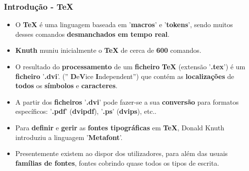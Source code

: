 \documentclass[12pt]{beamer}
\begin{document}
\begin{frame}
\frametitle{{\color{blue}\bf Introdução - \TeX}}
\begin{itemize}
\item<1->O {\color{blue}\bf TeX} é uma linguagem baseada em 
'{\color{DarkGreen}\bf macros}' e '{\color{DarkGreen}\bf tokens}', 
sendo muitos desses comandos {\color{DarkRed}\bf desmanchados em tempo real}.
\item<2->{\color{blue}\bf Knuth} muniu inicialmente o {\color{blue}\bf TeX} 
de cerca de {\color{red}\bf 600} comandos.
\item<3->O resultado do {\color{DarkGreen}\bf processamento} de um 
{\color{DarkRed}\bf ficheiro} {\color{blue}\bf TeX} 
(extensão '{\color{blue}\bf .tex}')
é um {\color{DarkRed}\bf ficheiro} '{\color{blue}\bf .dvi}'.
(''{\color{DarkGreen} {\bf D}e{\bf V}ice {\bf I}ndependent}'') 
que contém as {\color{DarkRed}\bf localizações} de
{\color{red}\bf todos} os {\color{DarkGreen}\bf símbolos} e 
{\color{DarkGreen}\bf caracteres}. 
\item<5->A partir dos {\color{DarkRed}\bf ficheiros} '{\color{blue}\bf .dvi}' 
pode fazer-se a sua {\color{red}\bf conversão} 
para formatos específicos: '{\color{red}\bf .pdf}' ({\color{blue}\bf dvipdf}), 
'{\color{red}\bf .ps}' ({\color{blue}\bf dvips}), etc..
\item<6->Para {\color{DarkGreen}\bf definir} e {\color{DarkGreen}\bf gerir} 
as {\color{DarkRed}\bf fontes tipográficas} em {\color{blue}\bf TeX}, 
Donald Knuth introduziu a linguagem '{\color{red}\bf Metafont}'.
\item<7->Presentemente existem ao dispor dos utilizadores, para além das
usuais {\color{blue}\bf famílias de fontes}, fontes cobrindo quase todos
os tipos de escrita.
\end{itemize}
\end{frame}
\end{document}
